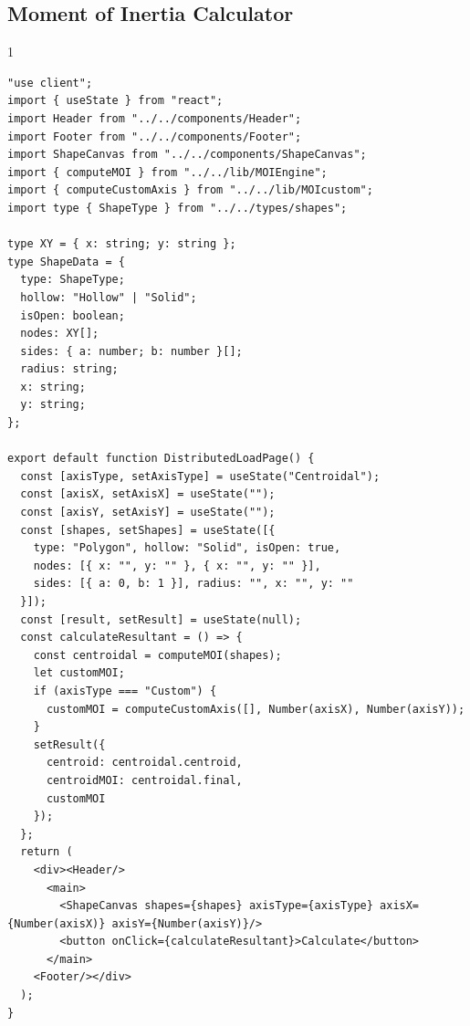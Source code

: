 \subsection*{Moment of Inertia Calculator}
\begin{spacing}{1}
\begin{Verbatim}[breaklines=true, breaksymbolleft={}, breaksymbolright={}]
"use client";
import { useState } from "react";
import Header from "../../components/Header";
import Footer from "../../components/Footer";
import ShapeCanvas from "../../components/ShapeCanvas";
import { computeMOI } from "../../lib/MOIEngine";
import { computeCustomAxis } from "../../lib/MOIcustom";
import type { ShapeType } from "../../types/shapes";

type XY = { x: string; y: string };
type ShapeData = {
  type: ShapeType;
  hollow: "Hollow" | "Solid";
  isOpen: boolean;
  nodes: XY[];
  sides: { a: number; b: number }[];
  radius: string;
  x: string;
  y: string;
};

export default function DistributedLoadPage() {
  const [axisType, setAxisType] = useState("Centroidal");
  const [axisX, setAxisX] = useState("");
  const [axisY, setAxisY] = useState("");
  const [shapes, setShapes] = useState([{
    type: "Polygon", hollow: "Solid", isOpen: true,
    nodes: [{ x: "", y: "" }, { x: "", y: "" }],
    sides: [{ a: 0, b: 1 }], radius: "", x: "", y: ""
  }]);
  const [result, setResult] = useState(null);
  const calculateResultant = () => {
    const centroidal = computeMOI(shapes);
    let customMOI;
    if (axisType === "Custom") {
      customMOI = computeCustomAxis([], Number(axisX), Number(axisY));
    }
    setResult({
      centroid: centroidal.centroid,
      centroidMOI: centroidal.final,
      customMOI
    });
  };
  return (
    <div><Header/>
      <main>
        <ShapeCanvas shapes={shapes} axisType={axisType} axisX={Number(axisX)} axisY={Number(axisY)}/>
        <button onClick={calculateResultant}>Calculate</button>
      </main>
    <Footer/></div>
  );
}
\end{Verbatim}
\end{spacing}

